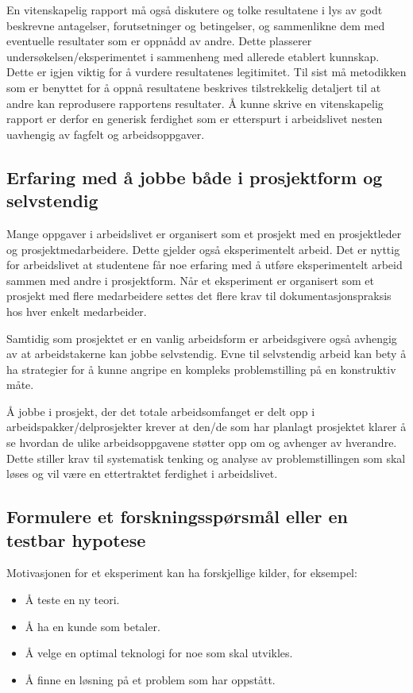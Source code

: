 \documentclass{article}
\begin{document}
En vitenskapelig rapport må også diskutere og tolke resultatene i lys av godt beskrevne antagelser,  forutsetninger og betingelser, og sammenlikne dem med eventuelle resultater som er oppnådd av andre.
Dette plasserer undersøkelsen/eksperimentet i sammenheng med allerede etablert kunnskap.
Dette er igjen viktig for å vurdere resultatenes legitimitet.
Til sist må metodikken som er benyttet for å oppnå resultatene beskrives tilstrekkelig detaljert til at andre kan reprodusere rapportens resultater.
Å kunne skrive en vitenskapelig rapport er derfor en generisk ferdighet som er etterspurt i arbeidslivet nesten uavhengig av fagfelt og arbeidsoppgaver.

\subsection{Erfaring med å jobbe både i prosjektform og selvstendig}
Mange oppgaver i arbeidslivet er organisert som et prosjekt med en prosjektleder og prosjektmedarbeidere.
Dette gjelder også eksperimentelt arbeid.
Det er nyttig for arbeidslivet at studentene får noe erfaring med å utføre eksperimentelt arbeid sammen med andre i prosjektform.
Når et eksperiment er organisert som et prosjekt med flere medarbeidere settes det flere krav til dokumentasjonspraksis hos hver enkelt medarbeider.

Samtidig som prosjektet er en vanlig arbeidsform er arbeidsgivere også avhengig av at arbeidstakerne kan jobbe selvstendig.
Evne til selvstendig arbeid kan bety å ha strategier for å kunne angripe en kompleks problemstilling på en konstruktiv måte.

Å jobbe i prosjekt, der det totale arbeidsomfanget er delt opp i arbeidspakker/delprosjekter krever at den/de som har planlagt prosjektet klarer å se hvordan de ulike arbeidsoppgavene støtter opp om og avhenger av hverandre.
Dette stiller krav til systematisk tenking og analyse av problemstillingen som skal løses og vil være en ettertraktet ferdighet i arbeidslivet.

\subsection{Formulere et forskningsspørsmål eller en testbar hypotese}
Motivasjonen for et eksperiment kan ha forskjellige kilder, for eksempel:
\begin{itemize}
  \item Å teste en ny teori.
  \item Å ha en kunde som betaler.
  \item Å velge en optimal teknologi for noe som skal utvikles.
  \item Å finne en løsning på et problem som har oppstått.
\end{itemize}
\end{document}

